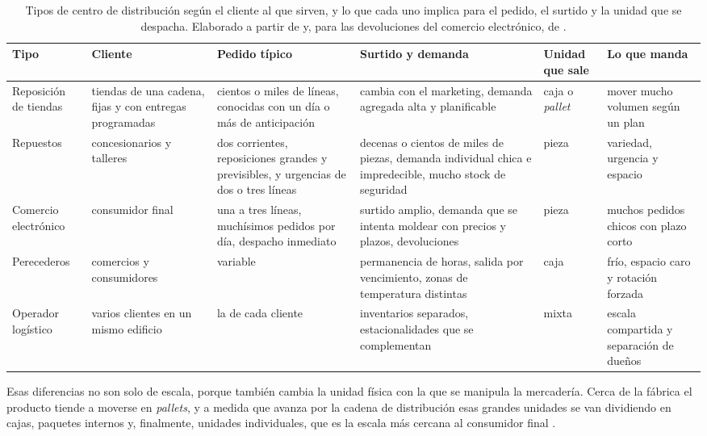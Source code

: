 \begin{table}[htbp]
    \centering
    \footnotesize
    \begin{tabularx}{\textwidth}{|>{\hsize}L|>{\hsize}L|>{\hsize}L|>{\hsize}L|>{\hsize}L|>{\hsize}L|}
        \hline
        \textbf{Tipo} & \textbf{Cliente} & \textbf{Pedido típico} & \textbf{Surtido y demanda} & \textbf{Unidad que sale} & \textbf{Lo que manda} \\
        \hline
        Reposición de tiendas & tiendas de una cadena, fijas y con entregas programadas & cientos o miles de líneas, conocidas con un día o más de anticipación & cambia con el marketing, demanda agregada alta y planificable & caja o \emph{pallet} & mover mucho volumen según un plan \\
        \hline
        Repuestos & concesionarios y talleres & dos corrientes, reposiciones grandes y previsibles, y urgencias de dos o tres líneas & decenas o cientos de miles de piezas, demanda individual chica e impredecible, mucho stock de seguridad & pieza & variedad, urgencia y espacio \\
        \hline
        Comercio electrónico & consumidor final & una a tres líneas, muchísimos pedidos por día, despacho inmediato & surtido amplio, demanda que se intenta moldear con precios y plazos, devoluciones & pieza & muchos pedidos chicos con plazo corto \\
        \hline
        Perecederos & comercios y consumidores & variable & permanencia de horas, salida por vencimiento, zonas de temperatura distintas & caja & frío, espacio caro y rotación forzada \\
        \hline
        Operador logístico & varios clientes en un mismo edificio & la de cada cliente & inventarios separados, estacionalidades que se complementan & mixta & escala compartida y separación de dueños \\
        \hline
    \end{tabularx}
    \caption{Tipos de centro de distribución según el cliente al que sirven, y lo que cada uno implica para el pedido, el surtido y la unidad que se despacha. Elaborado a partir de \citet[sección~1.2]{bartholdi2014warehouse} y, para las devoluciones del comercio electrónico, de \citet{boysen2019warehousing}.}
    \label{tab:tipos-deposito}
\end{table}

Esas diferencias no son solo de escala, porque también cambia la unidad física con la que se manipula la mercadería.
Cerca de la fábrica el producto tiende a moverse en \emph{pallets}, y a medida que avanza por la cadena de distribución esas grandes unidades se van dividiendo en cajas, paquetes internos y, finalmente, unidades individuales, que es la escala más cercana al consumidor final \citep[sección~2.2]{bartholdi2014warehouse}.

